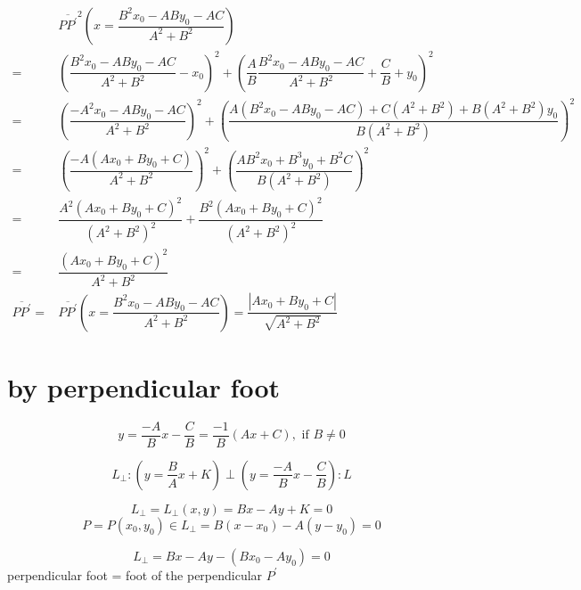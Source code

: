 \documentclass[
]{book}
\theoremstyle{definition}
\theoremstyle{definition}
\theoremstyle{definition}
\theoremstyle{definition}
\theoremstyle{remark}
\begin{document}
\[
\begin{aligned}
 & \overline{PP^{\prime}}^{2}\left(x=\dfrac{B^{2}x_{0}-ABy_{0}-AC}{A^{2}+B^{2}}\right)\\
= & \left(\dfrac{B^{2}x_{0}-ABy_{0}-AC}{A^{2}+B^{2}}-x_{0}\right)^{2}+\left(\dfrac{A}{B}\dfrac{B^{2}x_{0}-ABy_{0}-AC}{A^{2}+B^{2}}+\dfrac{C}{B}+y_{0}\right)^{2}\\
= & \left(\dfrac{-A^{2}x_{0}-ABy_{0}-AC}{A^{2}+B^{2}}\right)^{2}+\left(\dfrac{A\left(B^{2}x_{0}-ABy_{0}-AC\right)+C\left(A^{2}+B^{2}\right)+B\left(A^{2}+B^{2}\right)y_{0}}{B\left(A^{2}+B^{2}\right)}\right)^{2}\\
= & \left(\dfrac{-A\left(Ax_{0}+By_{0}+C\right)}{A^{2}+B^{2}}\right)^{2}+\left(\dfrac{AB^{2}x_{0}+B^{3}y_{0}+B^{2}C}{B\left(A^{2}+B^{2}\right)}\right)^{2}\\
= & \dfrac{A^{2}\left(Ax_{0}+By_{0}+C\right)^{2}}{\left(A^{2}+B^{2}\right)^{2}}+\dfrac{B^{2}\left(Ax_{0}+By_{0}+C\right)^{2}}{\left(A^{2}+B^{2}\right)^{2}}\\
= & \dfrac{\left(Ax_{0}+By_{0}+C\right)^{2}}{A^{2}+B^{2}}\\
\overline{PP^{\prime}}= & \overline{PP^{\prime}}\left(x=\dfrac{B^{2}x_{0}-ABy_{0}-AC}{A^{2}+B^{2}}\right)=\dfrac{\left|Ax_{0}+By_{0}+C\right|}{\sqrt{A^{2}+B^{2}}}
\end{aligned}
\]

\section{by perpendicular foot}\label{by-perpendicular-foot}

\[
y=\dfrac{-A}{B}x-\dfrac{C}{B}=\dfrac{-1}{B}\left(Ax+C\right),\text{ if }B\ne0
\]

\[
L_{\perp}:\left(y=\dfrac{B}{A}x+K\right)\perp\left(y=\dfrac{-A}{B}x-\dfrac{C}{B}\right):L
\]

\[
L_{\perp}=L_{\perp}\left(x,y\right)=Bx-Ay+K=0
\]
\[
P=P\left(x_{0},y_{0}\right)\in L_{\perp}=B\left(x-x_{0}\right)-A\left(y-y_{0}\right)=0
\]

\[
L_{\perp}=Bx-Ay-\left(Bx_{0}-Ay_{0}\right)=0
\]
perpendicular foot = foot of the perpendicular \(P^{\prime}\)
\end{document}
